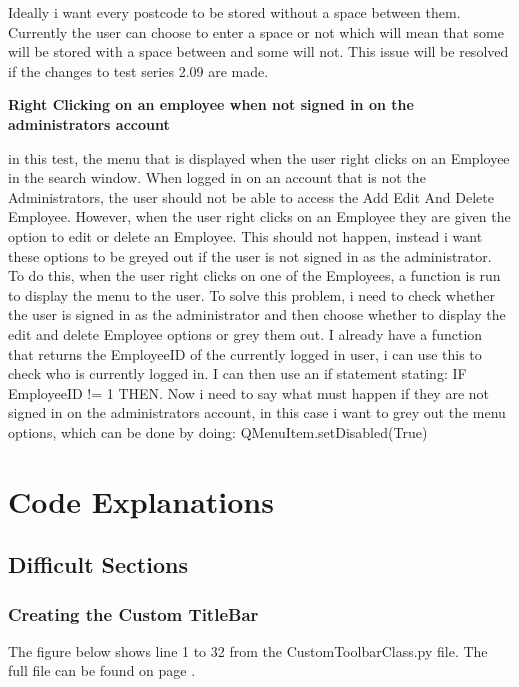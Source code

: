  Ideally i want every postcode to be stored without a space between them. Currently the user can choose to enter a space or not which will mean that some will be stored with a space between and some will not. This issue will be resolved if the changes to test series 2.09 are made.

\textbf{Right Clicking on an employee when not signed in on the administrators account}

in this test, the menu that is displayed when the user right clicks on an Employee in the search window. When logged in on an account that is not the Administrators, the user should not be able to access the Add Edit And Delete Employee. However, when the user right clicks on an Employee they are given the option to edit or delete an Employee. This should not happen, instead i want these options to be greyed out if the user is not signed in as the administrator. To do this, when the user right clicks on one of the Employees, a function is run to display the menu to the user. To solve this problem, i need to check whether the user is signed in as the administrator and then choose whether to display the edit and delete Employee options or grey them out. I already have a function that returns the EmployeeID of the currently logged in user, i can use this to check who is currently logged in. I can then use an if statement stating: IF EmployeeID != 1 THEN. Now i need to say what must happen if they are not signed in on the administrators account, in this case i want to grey out the menu options, which can be done by doing: QMenuItem.setDisabled(True)
\pagebreak

\section{Code Explanations}

\subsection{Difficult Sections}

\subsubsection{Creating the Custom TitleBar} 

The figure below shows line 1 to 32 from the CustomToolbarClass.py file. The full file can be found on page \pageref{fig:CustomToolbarClass}.


